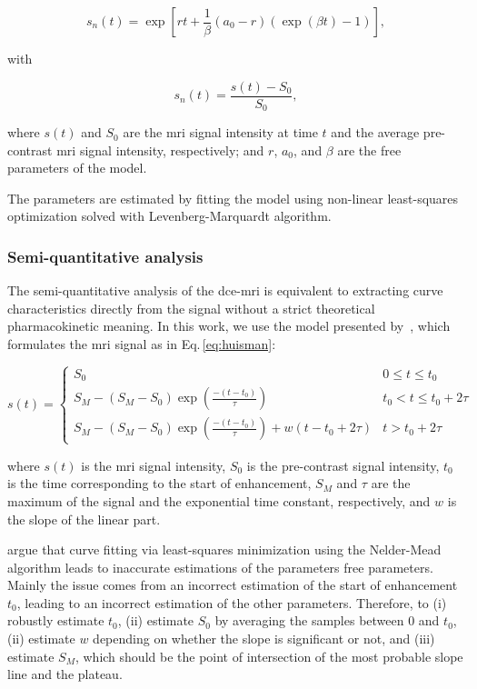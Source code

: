 \begin{equation}
  s_n(t) = \exp\left[rt + \frac{1}{\beta} \left( a_0 - r \right) \left( \exp(\beta t) - 1 \right) \right],
  \label{eq:pun}
\end{equation}

\noindent with

\begin{equation}
  s_n(t) = \frac{s(t) - S_0}{S_0},
  \label{eq:enh}
\end{equation}

\noindent where $s(t)$ and $S_0$ are the \ac{mri} signal intensity at
time $t$ and the average pre-contrast \ac{mri} signal intensity,
respectively; and $r$, $a_0$, and $\beta$ are the free parameters of the model.

The parameters are estimated by fitting the model using non-linear
least-squares optimization solved with Levenberg-Marquardt algorithm.

\subsubsection{Semi-quantitative analysis}\label{sec:semi}

The semi-quantitative analysis of the \ac{dce}-\ac{mri} is equivalent to extracting curve characteristics directly from the signal without a strict theoretical pharmacokinetic meaning.
In this work, we use the model presented by~\cite{huisman2001accurate}, which formulates the \ac{mri} signal as in Eq.\,\eqref{eq:huisman}:

\begin{equation}
  s(t) = \begin{cases}
    S_0 & 0 \leq t \leq t_0 \\
    S_M - (S_M - S_0) \exp\left( \frac{-(t - t_0)}{\tau} \right) & t_0 < t \leq t_0 + 2 \tau \\
    S_M - (S_M - S_0) \exp\left( \frac{-(t - t_0)}{\tau} \right) + w(t - t_0 + 2 \tau) & t > t_0 + 2 \tau
  \end{cases}
  \label{eq:huisman}
\end{equation}

\noindent where $s(t)$ is the \ac{mri} signal intensity, $S_0$ is the
pre-contrast signal intensity, $t_0$ is the time corresponding to the
start of enhancement, $S_M$ and $\tau$ are the maximum of the signal
and the exponential time constant, respectively, and $w$ is the slope of the linear part.

\citeauthor{huisman2001accurate} argue that curve fitting via
least-squares minimization using the Nelder-Mead algorithm leads to
inaccurate estimations of the parameters free parameters.
Mainly the issue comes from an incorrect estimation of the start of
enhancement $t_0$, leading to an incorrect estimation of the other parameters.
Therefore, \citeauthor{huisman2001accurate} to
(i) robustly estimate $t_0$,
(ii) estimate $S_0$ by averaging the samples between $0$ and $t_0$,
(ii) estimate $w$ depending on whether the slope is significant or
not, and
(iii) estimate $S_M$, which should be the point of intersection of the most probable slope line and the plateau.

